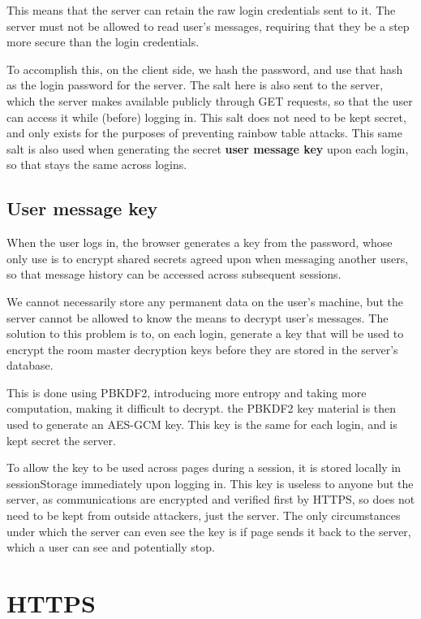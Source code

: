 \documentclass[12pt]{article}
\begin{document}
This means that the server can retain the raw login credentials sent to it. The server must not be allowed to read user's messages, requiring that they be a step more secure than the login credentials.

To accomplish this, on the client side, we hash the password, and use that hash as the login password for the server. The salt here is also sent to the server, which the server makes available publicly through GET requests, so that the user can access it while (before) logging in. This salt does not need to be kept secret, and only exists for the purposes of preventing rainbow table attacks. This same salt is also used when generating the secret \textbf{user message key} upon each login, so that stays the same across logins.

\subsection{User message key}

When the user logs in, the browser generates a key from the password, whose only use is to encrypt shared secrets agreed upon when messaging another users, so that message history can be accessed across subsequent sessions.

We cannot necessarily store any permanent data on the user's machine, but the server cannot be allowed to know the means to decrypt user's messages. The solution to this problem is to, on each login, generate a key that will be used to encrypt the room master decryption keys before they are stored in the server's database.

This is done using PBKDF2, introducing more entropy and taking more computation, making it difficult to decrypt. the PBKDF2 key material is then used to generate an AES-GCM key. This key is the same for each login, and is kept secret the server.

To allow the key to be used across pages during a session, it is stored locally in sessionStorage immediately upon logging in. This key is useless to anyone but the server, as communications are encrypted and verified first by HTTPS, so does not need to be kept from outside attackers, just the server. The only circumstances under which the server can even see the key is if page sends it back to the server, which a user can see and potentially stop.

\section{HTTPS}
\end{document}
